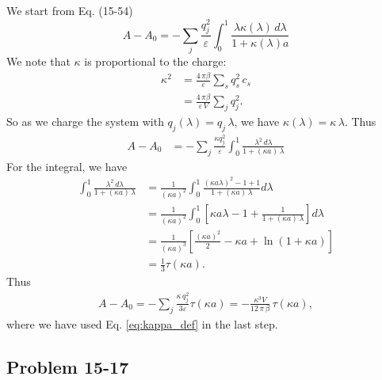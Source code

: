 \documentclass[twocolumn, 10pt]{article}
\numberwithin{equation}{section}
\newenvironment{solution}[1][\empty]
{\par\medskip\sffamily
  \textbf{\ifx\empty#1{Solution.}\relax\else{#1}\fi} \ignorespaces}
{\medskip}
\begin{document}
\begin{solution}
  We start from Eq. (15-54)
  \begin{equation}
    A - A_0
    =
    -\sum_j \frac{q_j^2}{\varepsilon}
    \int_0^1 \frac{\lambda \kappa(\lambda) \, d\lambda }
    {1 + \kappa(\lambda) a }
    \tag{15-54}
  \end{equation}
  We note that $\kappa$
  is proportional to the charge:
  \begin{align}
    \kappa^2
    &=
    \frac{4 \, \pi \beta} {\varepsilon}
    \sum_s q_s^2 \, c_s
    \label{eq:kappa_def}
    \tag{15-30}
    \\
    &=
    \frac{4 \, \pi \beta} {\varepsilon \, V}
    \sum_j q_j^2
    .
    \label{eq:kappa_sumj}
  \end{align}
  So as we charge the system with $q_j(\lambda) = q_j\, \lambda$,
  we have $\kappa(\lambda) = \kappa \, \lambda$.
  Thus
  \begin{align*}
    A - A_0
    &=
    -\sum_j \frac{\kappa q_j^2}{\varepsilon}
    \int_0^1 \frac{\lambda^2 \, d\lambda }
    {1 + (\kappa a) \, \lambda }
  \end{align*}
  For the integral, we have
  \begin{align*}
    \int_0^1 \frac{ \lambda^2 \, d\lambda }
    {1 + (\kappa a) \, \lambda }
    &=
    \frac{1}{(\kappa a)^2}
    \int_0^1 \frac{ (\kappa a \lambda)^2 - 1 + 1 }
    {1 + (\kappa a) \, \lambda }
    d\lambda
    \\
    &=
    \frac{1}{(\kappa a)^2}
    \int_0^1
    \left[
      \kappa a \lambda - 1 +
      \frac{ 1 }
      {1 + (\kappa a) \, \lambda }
    \right]
    d\lambda
    \\
    &=
    \frac{1}{(\kappa a)^3}
    \left[
      \frac{(\kappa a)^2}{2}
      -\kappa a
      +\ln(1 + \kappa a)
    \right]
    \\
    &=\frac{1}{3} \tau(\kappa a)
    .
  \end{align*}
  Thus
  \begin{align}
    A - A_0
    =
    -\sum_j \frac{\kappa \, q_j^2}{3\varepsilon}
    \tau(\kappa a)
    =
    -\frac{ \kappa^3 V } { 12 \, \pi \, \beta }
    \, \tau(\kappa a),
  \end{align}
  where we have used Eq. \eqref{eq:kappa_def}
  in the last step.
\end{solution}



\subsection{Problem 15-17}
\end{document}
